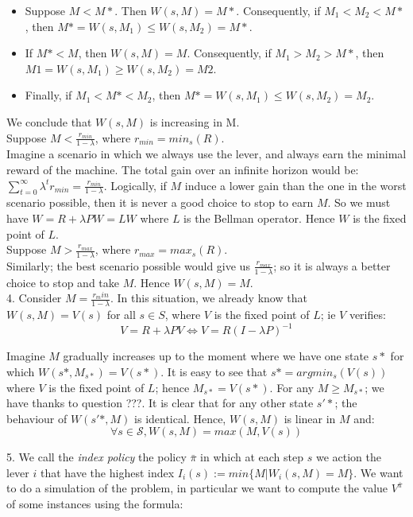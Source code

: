 \documentclass[12pt]{article}
\begin{document}
\begin{itemize}
    \item Suppose $M< M*$. Then $ W(s,M) = M*$. Consequently, if $M_1 < M_2 < M*$, then  $M* = W(s, M_1) \le W(s, M_2) = M*$.
    \item If $M* < M$, then $W(s, M) = M$. Consequently, if $M_1 > M_2 > M*$, then $M1 = W(s, M_1) \ge W(s, M_2) = M2$.
    \item Finally, if $M_1 < M* < M_2$, then $M* = W(s, M_1)  \le W(s, M_2) = M_2$.
\end{itemize}

We conclude that $W(s, M)$ is increasing in M. \\

Suppose $M < \tfrac{r_{min}}{1-\lambda}$, where $r_{min} = min_s (R)$. \\
Imagine a scenario in which we always use the lever, and always earn the minimal reward of the machine. The total gain over an infinite horizon would be: $\sum_{t=0}^{\infty} \lambda ^t r_{min}  = \frac{r_{min}}{1-\lambda}$. Logically, if $M$ induce a lower gain than the one in the worst scenario possible, then it is never a good choice to stop to earn $M$. So we must have $W = R + \lambda P W = LW$ where $L $ is the Bellman operator. Hence $W$ is the fixed point of $L$.  \\

Suppose $M > \tfrac{r_{max}}{1-\lambda}$, where $r_{max} = max_s (R)$. \\
Similarly; the best scenario possible would give us $\frac{r_{max}}{1-\lambda}$; so it is always a better choice to stop and take $M$. Hence $W(s,M) = M$. \\

4. Consider $M= \tfrac{r_min}{1-\lambda}$. In this situation, we already know that $W(s,M) = V(s)$ for all $s \in S$, where $V$ is the fixed point of $L$; ie $V$ verifies: $$ V = R + \lambda P V \Leftrightarrow V = R ( I - \lambda P)^{-1}$$

Imagine $M$ gradually increases up to the moment where we have one state $s*$ for which $W(s*,M_{s*} ) = V(s*)$. It is easy to see that $s* = argmin_s (V(s))$ where $V$ is the fixed point of $L$; hence $M_{s*} = V(s*)$. For any $M \ge M_{s*}$; we have thanks to question ???. It is clear that for any other state $s'*$; the behaviour of $W(s'*,M)$ is identical. Hence, $W(s, M)$ is linear in $M$ and: 
$$ \forall s \in \mathcal{S}, W(s,M) = max(M, V(s))$$


5. We call the \textit{index policy} the policy $\bar{\pi}$ in which at each step $s$ we action the lever $i$ that have the highest index $I_i(s):= min\{M | W_i(s, M) = M\}$.
 We want to do a simulation of the problem, in particular we want to compute the value $V^{\bar{\pi}}$ of some instances using the formula:
\end{document}
